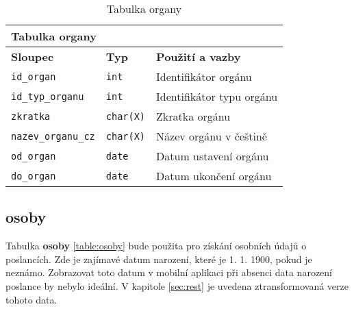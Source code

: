 \begin{center}
	\begin{longtable}{|l|l|p{9cm}|}
		\caption{Tabulka organy} \label{table:organy} \\
		
		\hline 
		
		\multicolumn{3}{|l|}{\textbf{Tabulka organy}} \\
		
		\hline 
		
		\multicolumn{1}{|l|}{\textbf{Sloupec}} & \multicolumn{1}{l|}{\textbf{Typ}} & \multicolumn{1}{l|}{\textbf{Použití a vazby}} \\ 
		
		\endhead
		
		\hline 
		
		\lstinline|id_organ| & \lstinline|int| & Identifikátor orgánu \\
		
		\hline 
		
		\lstinline|id_typ_organu| & \lstinline|int| & Identifikátor typu orgánu \\
		
		\hline 
		
		\lstinline|zkratka| & \lstinline|char(X)| & Zkratka orgánu \\
		
		\hline 
		
		\lstinline|nazev_organu_cz|	 & \lstinline|char(X)|	 & Název orgánu v češtině
		\\
		
		\hline 
		
		\lstinline|od_organ| & \lstinline|date| & Datum ustavení orgánu
		\\
		
		\hline 
		
		\lstinline|do_organ| & \lstinline|date| & Datum ukončení orgánu
		\\
		
		\hline 
		
	\end{longtable}
\end{center}

\subsection*{osoby}

Tabulka \textbf{osoby} \ref{table:osoby} bude použita pro získání osobních údajů o poslancích. Zde je zajímavé datum narození, které je 1. 1. 1900, pokud je neznámo. Zobrazovat toto datum v mobilní aplikaci při absenci data narození poslance by nebylo ideální. V kapitole \ref{sec:rest} je uvedena ztransformovaná verze tohoto data.

